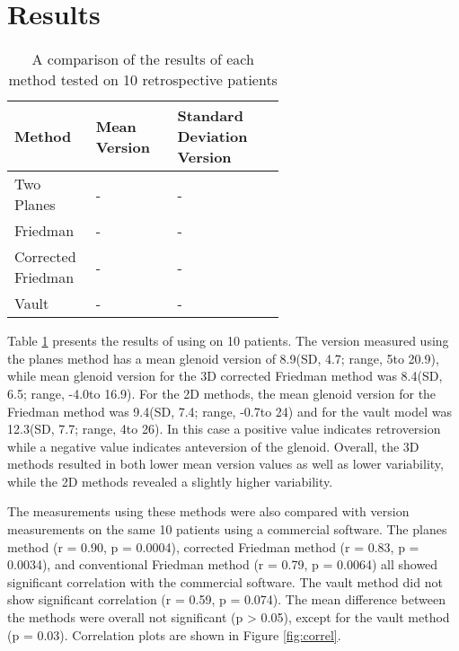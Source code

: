 \section{Results}
\label{sec:results}
\begin{table}
	\begin{center}
		\begin{tabular}{|p{0.3\linewidth}|p{0.3\linewidth}|p{}|} \hline
			Method & Mean Version & Standard Deviation Version \\ \hline
			Two Planes & - & - \\
			Friedman & - & - \\
			Corrected Friedman & - & - \\
			Vault & - & - \\
                        \hline
		\end{tabular}
	\end{center}
	\caption{\label{tab:results}A comparison of the results of each method tested 
	on 10 retrospective patients}
\end{table}

Table \ref{tab:results} presents the results of using \sksglenoid on 10 patients.
The version measured using the planes method has a mean glenoid
version of 8.9\degree (SD, 4.7\degree; range, 5\degree to 20.9\degree), 
while mean glenoid version 
for the 3D corrected Friedman method 
was 8.4\degree (SD, 6.5\degree; range, -4.0\degree to 16.9\degree). 
For the 2D methods, the mean glenoid version for the 
Friedman method was 9.4\degree (SD, 7.4\degree; range, -0.7\degree to 24\degree) 
and for the vault model was 12.3\degree (SD, 7.7\degree; range, 4\degree to 26\degree).
In this 
case a positive value indicates retroversion while a negative value indicates anteversion of the 
glenoid. Overall, the 3D methods resulted in both lower mean version values as well as lower
variability, while the 2D methods revealed a slightly higher variability.

The measurements using these methods were also compared with version measurements on the same
10 patients using a commercial software\cite{djosurgical}. 
The planes method (r = 0.90, p = 0.0004), 
corrected Friedman method (r = 0.83, p = 0.0034), 
and conventional Friedman method (r = 0.79, p = 0.0064) 
all showed significant correlation with the commercial software. 
The vault method did not show significant correlation (r = 0.59, p = 0.074).  
The mean difference between the methods were overall not significant (p > 0.05), 
except for the vault method (p = 0.03). Correlation plots are shown in Figure \ref{fig:correl}.
